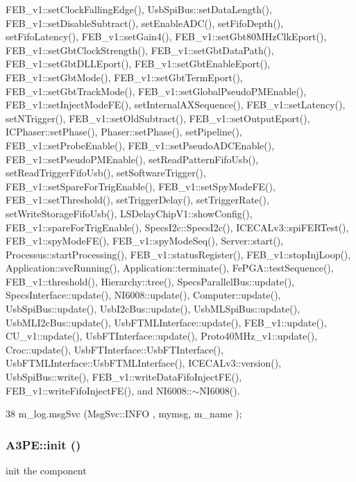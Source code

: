 FEB\_\-v1::setClockFallingEdge(), UsbSpiBus::setDataLength(), FEB\_\-v1::setDisableSubtract(), setEnableADC(), setFifoDepth(), setFifoLatency(), FEB\_\-v1::setGain4(), FEB\_\-v1::setGbt80MHzClkEport(), FEB\_\-v1::setGbtClockStrength(), FEB\_\-v1::setGbtDataPath(), FEB\_\-v1::setGbtDLLEport(), FEB\_\-v1::setGbtEnableEport(), FEB\_\-v1::setGbtMode(), FEB\_\-v1::setGbtTermEport(), FEB\_\-v1::setGbtTrackMode(), FEB\_\-v1::setGlobalPseudoPMEnable(), FEB\_\-v1::setInjectModeFE(), setInternalAXSequence(), FEB\_\-v1::setLatency(), setNTrigger(), FEB\_\-v1::setOldSubtract(), FEB\_\-v1::setOutputEport(), ICPhaser::setPhase(), Phaser::setPhase(), setPipeline(), FEB\_\-v1::setProbeEnable(), FEB\_\-v1::setPseudoADCEnable(), FEB\_\-v1::setPseudoPMEnable(), setReadPatternFifoUsb(), setReadTriggerFifoUsb(), setSoftwareTrigger(), FEB\_\-v1::setSpareForTrigEnable(), FEB\_\-v1::setSpyModeFE(), FEB\_\-v1::setThreshold(), setTriggerDelay(), setTriggerRate(), setWriteStorageFifoUsb(), LSDelayChipV1::showConfig(), FEB\_\-v1::spareForTrigEnable(), SpecsI2c::SpecsI2c(), ICECALv3::spiFERTest(), FEB\_\-v1::spyModeFE(), FEB\_\-v1::spyModeSeq(), Server::start(), Processus::startProcessing(), FEB\_\-v1::statusRegister(), FEB\_\-v1::stopInjLoop(), Application::svcRunning(), Application::terminate(), FePGA::testSequence(), FEB\_\-v1::threshold(), Hierarchy::tree(), SpecsParallelBus::update(), SpecsInterface::update(), NI6008::update(), Computer::update(), UsbSpiBus::update(), UsbI2cBus::update(), UsbMLSpiBus::update(), UsbMLI2cBus::update(), UsbFTMLInterface::update(), FEB\_\-v1::update(), CU\_\-v1::update(), UsbFTInterface::update(), Proto40MHz\_\-v1::update(), Croc::update(), UsbFTInterface::UsbFTInterface(), UsbFTMLInterface::UsbFTMLInterface(), ICECALv3::version(), UsbSpiBus::write(), FEB\_\-v1::writeDataFifoInjectFE(), FEB\_\-v1::writeFifoInjectFE(), and NI6008::$\sim$NI6008().


\begin{DoxyCode}
38 { m_log.msgSvc (MsgSvc::INFO    , mymsg, m_name ); }
\end{DoxyCode}
\hypertarget{classA3PE_abe07bae8ce2f32926b7258f269ae655e}{
\subsubsection[{init}]{ A3PE::init ()}}
\label{classA3PE_abe07bae8ce2f32926b7258f269ae655e}
init the component

